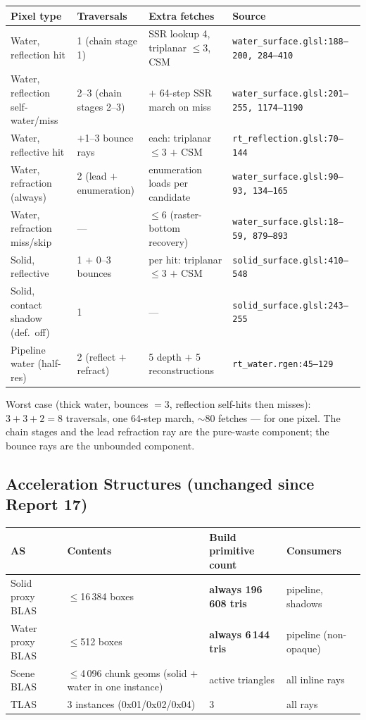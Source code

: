 \documentclass[11pt,a4paper]{article}
\begin{document}
\begin{longtable}{@{}llll@{}}
\toprule
\textbf{Pixel type} & \textbf{Traversals} & \textbf{Extra fetches} & \textbf{Source} \\
\midrule
Water, reflection hit & 1 (chain stage 1) & SSR lookup 4, triplanar $\leq$3, CSM & \texttt{water\_surface.glsl:188--200, 284--410} \\
Water, reflection self-water/miss & 2--3 (chain stages 2--3) & $+$ 64-step SSR march on miss & \texttt{water\_surface.glsl:201--255, 1174--1190} \\
Water, reflective hit & $+$1--3 bounce rays & each: triplanar $\leq$3 $+$ CSM & \texttt{rt\_reflection.glsl:70--144} \\
Water, refraction (always) & 2 (lead $+$ enumeration) & enumeration loads per candidate & \texttt{water\_surface.glsl:90--93, 134--165} \\
Water, refraction miss/skip & --- & $\leq$6 (raster-bottom recovery) & \texttt{water\_surface.glsl:18--59, 879--893} \\
Solid, reflective & 1 $+$ 0--3 bounces & per hit: triplanar $\leq$3 $+$ CSM & \texttt{solid\_surface.glsl:410--548} \\
Solid, contact shadow (def.\ off) & 1 & --- & \texttt{solid\_surface.glsl:243--255} \\
Pipeline water (half-res) & 2 (reflect $+$ refract) & 5 depth $+$ 5 reconstructions & \texttt{rt\_water.rgen:45--129} \\
\bottomrule
\end{longtable}

Worst case (thick water, bounces $=3$, reflection self-hits then misses): $3 + 3 + 2 = 8$ traversals, one 64-step march, $\sim$80 fetches --- for one pixel. The chain stages and the lead refraction ray are the pure-waste component; the bounce rays are the unbounded component.

\subsection{Acceleration Structures (unchanged since Report 17)}

\begin{longtable}{@{}llll@{}}
\toprule
\textbf{AS} & \textbf{Contents} & \textbf{Build primitive count} & \textbf{Consumers} \\
\midrule
Solid proxy BLAS & $\leq$16\,384 boxes & \textbf{always 196\,608 tris} & pipeline, shadows \\
Water proxy BLAS & $\leq$512 boxes & \textbf{always 6\,144 tris} & pipeline (non-opaque) \\
Scene BLAS & $\leq$4\,096 chunk geoms (solid $+$ water in one instance) & active triangles & all inline rays \\
TLAS & 3 instances (0x01/0x02/0x04) & 3 & all rays \\
\bottomrule
\end{longtable}
\end{document}
